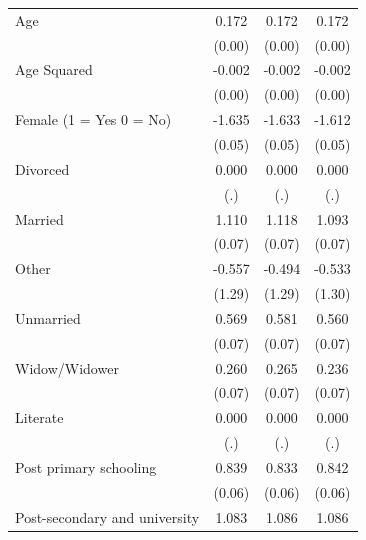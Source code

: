 {\begin{tabular}{l*{3}{c}}
Age                 &       0.172\sym{***}&       0.172\sym{***}&       0.172\sym{***}\\
                    &      (0.00)         &      (0.00)         &      (0.00)         \\
Age Squared         &      -0.002\sym{***}&      -0.002\sym{***}&      -0.002\sym{***}\\
                    &      (0.00)         &      (0.00)         &      (0.00)         \\
Female (1 = Yes 0 = No)&      -1.635\sym{***}&      -1.633\sym{***}&      -1.612\sym{***}\\
                    &      (0.05)         &      (0.05)         &      (0.05)         \\
Divorced            &       0.000         &       0.000         &       0.000         \\
                    &         (.)         &         (.)         &         (.)         \\
Married             &       1.110\sym{***}&       1.118\sym{***}&       1.093\sym{***}\\
                    &      (0.07)         &      (0.07)         &      (0.07)         \\
Other               &      -0.557         &      -0.494         &      -0.533         \\
                    &      (1.29)         &      (1.29)         &      (1.30)         \\
Unmarried           &       0.569\sym{***}&       0.581\sym{***}&       0.560\sym{***}\\
                    &      (0.07)         &      (0.07)         &      (0.07)         \\
Widow/Widower       &       0.260\sym{***}&       0.265\sym{***}&       0.236\sym{**} \\
                    &      (0.07)         &      (0.07)         &      (0.07)         \\
Literate            &       0.000         &       0.000         &       0.000         \\
                    &         (.)         &         (.)         &         (.)         \\
Post primary schooling&       0.839\sym{***}&       0.833\sym{***}&       0.842\sym{***}\\
                    &      (0.06)         &      (0.06)         &      (0.06)         \\
Post-secondary and university&       1.083\sym{***}&       1.086\sym{***}&       1.086\sym{***}\\

\end{tabular}}
